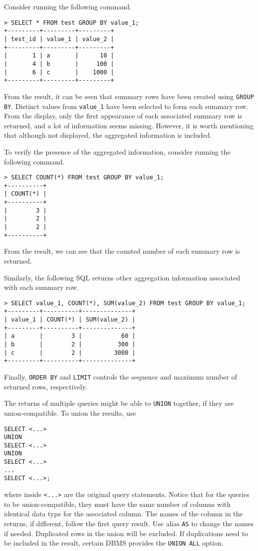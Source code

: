 Consider running the following command.
\begin{lstlisting}
> SELECT * FROM test GROUP BY value_1;
+---------+---------+---------+
| test_id | value_1 | value_2 |
+---------+---------+---------+
|       1 | a       |      10 |
|       4 | b       |     100 |
|       6 | c       |    1000 |
+---------+---------+---------+
\end{lstlisting}
From the result, it can be seen that summary rows have been created using \verb|GROUP BY|. Distinct values from \verb|value_1| have been selected to form each summary row. From the display, only the first appearance of each associated summary row is returned, and a lot of information seems missing. However, it is worth mentioning that although not displayed, the aggregated information is included.

To verify the presence of the aggregated information, consider running the following command.
\begin{lstlisting}
> SELECT COUNT(*) FROM test GROUP BY value_1;
+----------+
| COUNT(*) |
+----------+
|        3 |
|        2 |
|        2 |
+----------+
\end{lstlisting}
From the result, we can see that the counted number of each summary row is returned.

Similarly, the following SQL returns other aggregation information associated with each summary row.
\begin{lstlisting}
> SELECT value_1, COUNT(*), SUM(value_2) FROM test GROUP BY value_1;
+---------+----------+--------------+
| value_1 | COUNT(*) | SUM(value_2) |
+---------+----------+--------------+
| a       |        3 |           60 |
| b       |        2 |          300 |
| c       |        2 |         3000 |
+---------+----------+--------------+
\end{lstlisting}

Finally, \verb|ORDER BY| and \verb|LIMIT| controls the sequence and maximum number of returned rows, respectively.

The returns of multiple queries might be able to \verb|UNION| together, if they are union-compatible. To union the results, use
\begin{lstlisting}
SELECT <...>
UNION
SELECT <...>
UNION
SELECT <...>
...
SELECT <...>;
\end{lstlisting}
where inside \verb|<...>| are the original query statements. Notice that for the queries to be union-compatible, they must have the same number of columns with identical data type for the associated column. The names of the column in the returns, if different, follow the first query result. Use alias \verb|AS| to change the names if needed. Duplicated rows in the union will be excluded. If duplications need to be included in the result, certain DBMS provides the \verb|UNION ALL| option.

